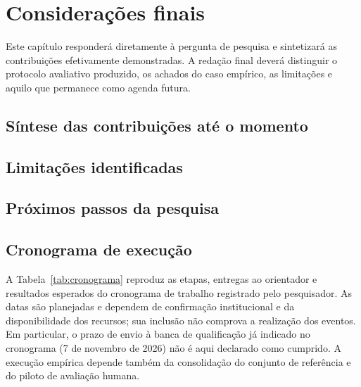 \section{Considerações finais}
\label{sec:finais}

Este capítulo responderá diretamente à pergunta de pesquisa e sintetizará as contribuições efetivamente demonstradas. A redação final deverá distinguir o protocolo avaliativo produzido, os achados do caso empírico, as limitações e aquilo que permanece como agenda futura.

\subsection{Síntese das contribuições até o momento}


\subsection{Limitações identificadas}


\subsection{Próximos passos da pesquisa}


\subsection{Cronograma de execução}

\label{sec:cronograma}

A Tabela~\ref{tab:cronograma} reproduz as etapas, entregas ao orientador e resultados esperados do cronograma de trabalho registrado pelo pesquisador. As datas são planejadas e dependem de confirmação institucional e da disponibilidade dos recursos; sua inclusão não comprova a realização dos eventos. Em particular, o prazo de envio à banca de qualificação já indicado no cronograma (7 de novembro de 2026) não é aqui declarado como cumprido. A execução empírica depende também da consolidação do conjunto de referência e do piloto de avaliação humana.

